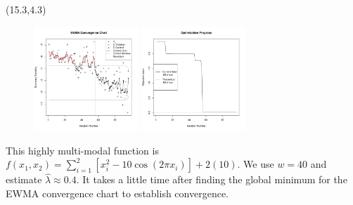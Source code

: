 \documentclass[a0,landscape]{a0poster}
\newcommand{\co}[2]{{{\bf \color{#1}{#2}}}}
\begin{document}
\begin{textblock}{8.8}(15.3,4.3)
\begin{figure}
\includegraphics[width=0.35\textwidth]{./figures/ewmaConvChartRastHardBW.pdf}
\includegraphics[width=0.35\textwidth]{./figures/bestZRastHardEnd.pdf}
\end{figure}

\vspace*{0.05in}
\noindent
\textsc{\co{blue}{\LARGE Rastrigin}}

\vspace{0.06in}
\noindent
\textsc{\co{blue}{\LARGE Test Function}}
\large

\noindent
This highly multi-modal function is $f(x_1, x_2) =
\sum_{i=1}^2\left[x_i^2-10\cos(2\pi x_i)\right] + 2(10)$.  
We use $w=40$ and estimate $\hat\lambda\approx 0.4$. It takes a little
time after finding the global minimum for the EWMA convergence
chart to establish convergence.
\end{textblock}
\end{document}
